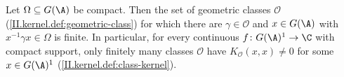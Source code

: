 Let $\Omega\subseteq G(\A)$ be compact. Then the set of geometric classes $\mathcal O$ (\cref{II.kernel.def:geometric-class}) for which there are
$\gamma\in\mathcal O$ and $x\in G(\A)$ with $x^{-1}\gamma x\in\Omega$ is finite. In particular, for every continuous $f\colon G(\A)^1\to\C$ with compact
support, only finitely many classes $\mathcal O$ have $K_{\mathcal O}(x,x)\neq0$ for some $x\in G(\A)^1$ (\cref{II.kernel.def:class-kernel}).
